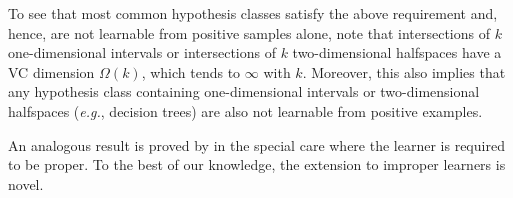 \documentclass[11pt]{article}
\theoremstyle{plain}
\theoremstyle{definition}
\theoremstyle{remark}
\newcommand{\eg}{\textit{e.g.}}
\begin{document}
    \impossiblityPositiveSampleLearning*
    \noindent 
    To see that most common hypothesis classes satisfy the above requirement and, hence, are not learnable from positive samples alone, note that intersections of $k$ one-dimensional intervals or intersections of $k$ two-dimensional halfspaces have a VC dimension $\Omega(k)$, which tends to $\infty$ with $k$.
    Moreover, this also implies that any hypothesis class containing one-dimensional intervals or two-dimensional halfspaces (\eg{}, decision trees) are also not learnable from positive examples.
    
    An analogous result is proved by \citet{natarajan1987learning} in the special care where the learner is required to be proper.
    To the best of our knowledge, the extension to improper learners is novel.

     
    \noindent 
\end{document}
